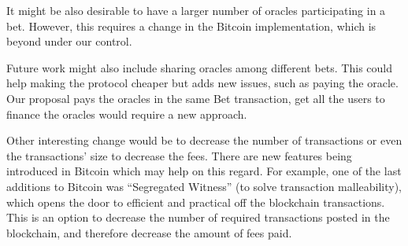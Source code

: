 It might be also desirable to have a larger number of oracles participating in
  a bet.
However, this requires a change in the Bitcoin implementation, which is beyond
  under our control.

Future work might also include sharing oracles among different bets.
This could help making the protocol cheaper but adds new issues, such as paying
  the oracle.
Our proposal pays the oracles in the same Bet transaction, get all the users to
  finance the oracles would require a new approach.

Other interesting change would be to decrease the number of transactions or
  even the transactions' size to decrease the fees.
There are new features being introduced in Bitcoin which may help on this
  regard.
For example, one of the last additions to Bitcoin was ``Segregated Witness''
  (to solve transaction malleability), which opens the door to efficient and
  practical off the blockchain transactions.
This is an option to decrease the number of required transactions posted in the
  blockchain, and therefore decrease the amount of fees paid.
